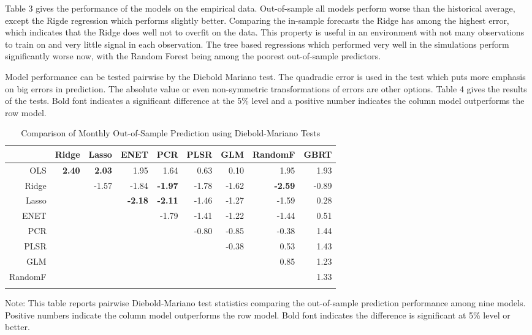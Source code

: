 \documentclass[11pt]{article}
\begin{document}
Table 3 gives the performance of the models on the empirical data.
Out-of-sample all models perform worse than the historical average,
except the Rigde regression which performs slightly better. Comparing
the in-sample forecasts the Ridge has among the highest error, which
indicates that the Ridge does well not to overfit on the data. This
property is useful in an environment with not many observations to train
on and very little signal in each observation. The tree based
regressions which performed very well in the simulations perform
significantly worse now, with the Random Forest being among the poorest
out-of-sample predictors.

Model performance can be tested pairwise by the Diebold Mariano test.
The quadradic error is used in the test which puts more emphasis
on big errors in prediction. The absolute value or even non-symmetric
transformations of errors are other options. Table 4 gives the results
of the tests. Bold font indicates a significant difference at the 5\%
level and a positive number indicates the column model outperforms the
row model.

\begin{table}[ht]
\begin{threeparttable}
\centering
\setlength{\tabcolsep}{5pt}
\caption{Comparison of Monthly Out-of-Sample Prediction using Diebold-Mariano Tests}
\centering
\begin{tabular}{r|rrrrrrrr}
  \Xhline{2\arrayrulewidth}
 & Ridge & Lasso & ENET & PCR & PLSR & GLM & RandomF & GBRT \\ 
  \hline
OLS & \textbf{2.40} & \textbf{2.03} & 1.95 & 1.64 & 0.63 & 0.10 & 1.95 & 1.93 \\ 
  Ridge && -1.57 & -1.84 & \textbf{-1.97} & -1.78 & -1.62 & \textbf{-2.59} & -0.89 \\ 
  Lasso &&& \textbf{-2.18} & \textbf{-2.11} & -1.46 & -1.27 & -1.59 & 0.28 \\ 
  ENET &&&& -1.79 & -1.41 & -1.22 & -1.44 & 0.51 \\ 
  PCR &&&&& -0.80 & -0.85 & -0.38 & 1.44 \\ 
  PLSR  &&&&&& -0.38 & 0.53 & 1.43 \\ 
  GLM  &&&&&&& 0.85 & 1.23 \\ 
  RandomF  &&&&&&&& 1.33 \\ 
   \Xhline{2\arrayrulewidth}
\end{tabular}
\begin{tablenotes}
      \small
      \item Note: This table reports pairwise Diebold-Mariano test statistics comparing the out-of-sample prediction performance among nine models. Positive numbers indicate the column model outperforms the row model. Bold font indicates the difference is significant at 5\% level or better.
    \end{tablenotes}
  \end{threeparttable}
\label{table:diebold}
\end{table}
\end{document}
